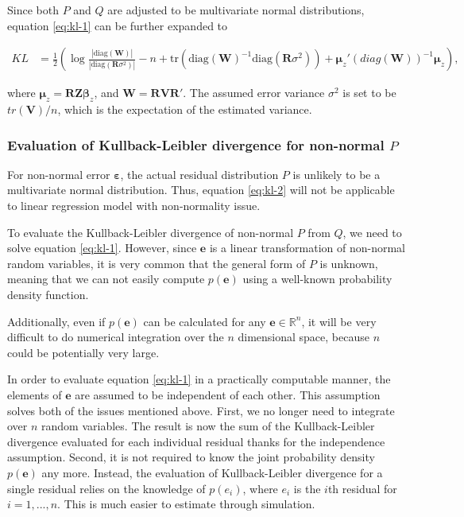 \documentclass[]{interact}
\theoremstyle{plain}%
\theoremstyle{definition}
\theoremstyle{remark}
\begin{document}
Since both \(P\) and \(Q\) are adjusted to be multivariate normal
distributions, equation \ref{eq:kl-1} can be further expanded to

\begin{align}
\label{eq:kl-2}
KL &= \frac{1}{2}\left(\log\frac{|\text{diag}(\boldsymbol{W})|}{|\text{diag}(\boldsymbol{R}\sigma^2)|} - n + \text{tr}(\text{diag}(\boldsymbol{W})^{-1}\text{diag}(\boldsymbol{R}\sigma^2)) + \boldsymbol{\mu}_z'(diag(\boldsymbol{W}))^{-1}\boldsymbol{\mu}_z\right),
\end{align}

\noindent where
\(\boldsymbol{\mu}_z = \boldsymbol{R}\boldsymbol{Z}\boldsymbol{\beta}_z\),
and \(\boldsymbol{W} = \boldsymbol{R}\boldsymbol{V}\boldsymbol{R}'\).
The assumed error variance \(\sigma^2\) is set to be
\(tr(\boldsymbol{V})/n\), which is the expectation of the estimated
variance.

\hypertarget{evaluation-of-kullback-leibler-divergence-for-non-normal-p}{%
\subsubsection{\texorpdfstring{Evaluation of Kullback-Leibler divergence
for non-normal
\(P\)}{Evaluation of Kullback-Leibler divergence for non-normal P}}\label{evaluation-of-kullback-leibler-divergence-for-non-normal-p}}

For non-normal error \(\boldsymbol{\varepsilon}\), the actual residual
distribution \(P\) is unlikely to be a multivariate normal distribution.
Thus, equation \ref{eq:kl-2} will not be applicable to linear regression
model with non-normality issue.

To evaluate the Kullback-Leibler divergence of non-normal \(P\) from
\(Q\), we need to solve equation \ref{eq:kl-1}. However, since
\(\boldsymbol{e}\) is a linear transformation of non-normal random
variables, it is very common that the general form of \(P\) is unknown,
meaning that we can not easily compute \(p(\boldsymbol{e})\) using a
well-known probability density function.

Additionally, even if \(p(\boldsymbol{e})\) can be calculated for any
\(\boldsymbol{e} \in \mathbb{R}^n\), it will be very difficult to do
numerical integration over the \(n\) dimensional space, because \(n\)
could be potentially very large.

In order to evaluate equation \ref{eq:kl-1} in a practically computable
manner, the elements of \(\boldsymbol{e}\) are assumed to be independent
of each other. This assumption solves both of the issues mentioned
above. First, we no longer need to integrate over \(n\) random
variables. The result is now the sum of the Kullback-Leibler divergence
evaluated for each individual residual thanks for the independence
assumption. Second, it is not required to know the joint probability
density \(p(\boldsymbol{e})\) any more. Instead, the evaluation of
Kullback-Leibler divergence for a single residual relies on the
knowledge of \(p(e_i)\), where \(e_i\) is the \(i\)th residual for
\(i = 1, ..., n\). This is much easier to estimate through simulation.
\end{document}
